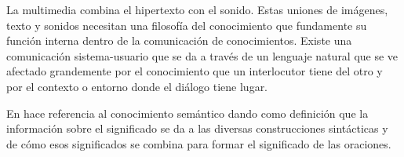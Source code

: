 La multimedia combina el hipertexto con el sonido. Estas uniones de imágenes, texto y sonidos necesitan una filosofía del conocimiento que fundamente su función interna dentro de la comunicación de conocimientos. Existe una comunicación sistema-usuario que se da a través de un lenguaje natural que se ve afectado grandemente por el conocimiento que un interlocutor tiene del otro y por el contexto o entorno donde el diálogo tiene lugar.


En \cite{Arquitectura} hace referencia al conocimiento semántico dando como definición que la información sobre el significado se da a las diversas construcciones sintácticas y de cómo esos significados se combina para formar el significado de las oraciones.


